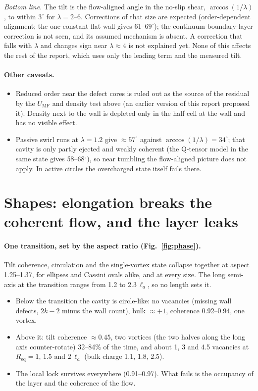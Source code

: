 \documentclass[11pt,a4paper]{article}
\newcommand{\la}{\ell_a}
\begin{document}
\emph{Bottom line.} The tilt is the flow-aligned angle in the no-slip shear, $\arccos(1/\lambda)$, to within $3^\circ$ for $\lambda=2$--6. Corrections of that size are expected
(order-dependent alignment; the one-constant flat wall gives 61--$69^\circ$); the continuum boundary-layer correction is not seen, and its assumed mechanism is absent. A correction that falls with $\lambda$ and changes sign near $\lambda\approx4$
is not explained yet. None of this affects the rest of the report, which uses only the leading term and the measured tilt.

\paragraph{Other caveats.}
\begin{itemize}
  \item Reduced order near the defect cores is ruled out as the source of the residual by the $U_\mathrm{MF}$ and density test above (an earlier version of this report proposed it).
        Density next to the wall is depleted only in the half cell at the wall and has no visible effect.
  \item Passive swirl runs at $\lambda=1.2$ give $\approx57^\circ$ against $\arccos(1/\lambda)=34^\circ$; that cavity is only partly ejected and weakly coherent (the Q-tensor model in
        the same state gives 58--68$^\circ$), so near tumbling the flow-aligned picture does not apply. In active circles the overcharged state itself fails there.
\end{itemize}

\section{Shapes: elongation breaks the coherent flow, and the layer leaks}\label{sec:shapes}
\paragraph{One transition, set by the aspect ratio (Fig.~\ref{fig:phase}).} Tilt coherence, circulation and the single-vortex state collapse together at aspect
1.25--1.37, for ellipses and Cassini ovals alike, and at every size. The long semi-axis at the transition ranges from 1.2 to 2.3\,$\la$, so no length sets it.
\begin{itemize}
  \item Below the transition the cavity is circle-like: no vacancies (missing wall defects, $2k-2$ minus the wall count), bulk $\approx+1$, coherence 0.92--0.94, one vortex.
  \item Above it: tilt coherence $\approx0.45$, two vortices (the two halves along the long axis counter-rotate) 32--84\% of the time, and about 1, 3 and 4.5 vacancies at $R_\mathrm{eq}=1$, 1.5 and $2\,\la$
        (bulk charge 1.1, 1.8, 2.5).
  \item The local lock survives everywhere (0.91--0.97). What fails is the occupancy of the layer and the coherence of the flow.
\end{itemize}
\end{document}

